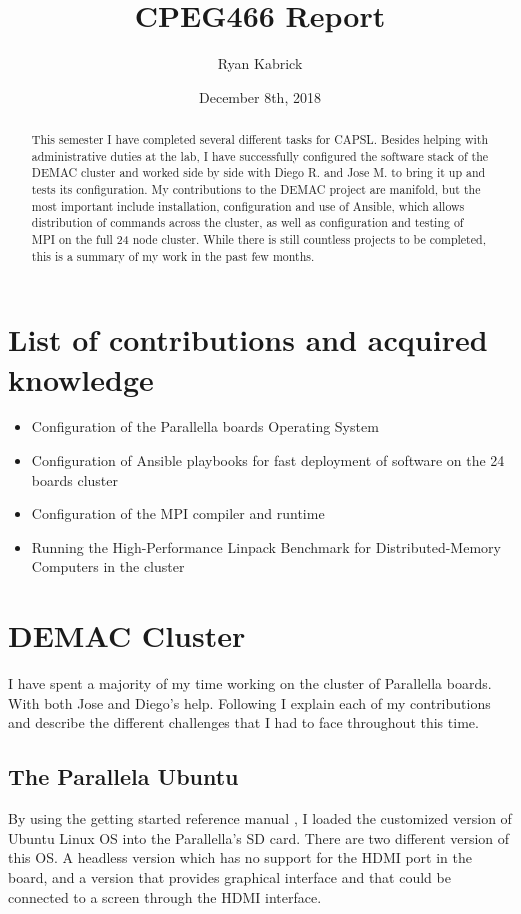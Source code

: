 \documentclass[letterpaper,12pt]{article}
\begin{document}
\title{CPEG466 Report}
\author{Ryan Kabrick}
\date{December 8th, 2018}
\maketitle

\begin{abstract}
This semester I have completed several different tasks for CAPSL. Besides helping with administrative duties at the lab, I have successfully configured the software stack of the DEMAC cluster and worked side by side with Diego R. and Jose M. to bring it up and tests its configuration. My contributions to the DEMAC project are manifold, but the most important include installation, configuration and use of Ansible, which allows distribution of commands across the cluster, as well as configuration and testing of MPI on the full 24 node cluster. While there is still countless projects to be completed, this is a summary of my work in the past few months.
\end{abstract}

\section{List of contributions and acquired knowledge}

\begin{itemize}
\item Configuration of the Parallella boards Operating System
\item Configuration of Ansible playbooks for fast deployment of software on the 24 boards cluster
\item Configuration of the MPI compiler and runtime
\item Running the High-Performance Linpack Benchmark for Distributed-Memory Computers in the cluster
\end{itemize}

\section{DEMAC Cluster}
I have spent a majority of my time working on the cluster of Parallella boards. With both Jose and Diego's help. Following I explain each of my contributions and describe the different challenges that I had to face throughout this time.

\subsection{The Parallela Ubuntu}
By using the getting started reference manual \cite{parallellaRefManual}, I loaded the customized version of Ubuntu Linux OS into the Parallella's SD card. There are two different version of this OS. A headless version which has no support for the HDMI port in the board, and a version that provides graphical interface and that could be connected to a screen through the HDMI interface.
\end{document}
